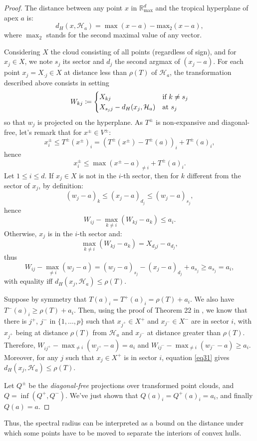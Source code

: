 \documentclass[oneside,UKenglish,a4paper]{amsart}
\numberwithin{equation}{section}
\numberwithin{figure}{section}
\theoremstyle{plain}
\theoremstyle{definition}
\theoremstyle{plain}
\theoremstyle{remark}
\theoremstyle{plain}
\theoremstyle{definition}
\theoremstyle{definition}
\begin{document}
\begin{proof}
The distance between any point $x$ in $\mathbb{R}_{\max}^d$ and the tropical hyperplane of apex $a$ is:
\[ d_H(x, \mathcal{H}_a) = \max(x-a) - \text{max}_2 (x-a), \]
where $\max_2$ stands for the second maximal value of any vector.

Considering $X$ the cloud consisting of all points (regardless of
sign), and for $x_{j}\in X$, we note $s_{j}$
its sector and $d_{j}$ the second argmax of $(x_{j}-a)$. For each
point $x_{j}=X_{\cdot j}\in X$ at distance less than $\rho(T)$ of
$\mathcal{H}_{a}$, the transformation described above consists in setting 
\[
W_{kj}\coloneqq\begin{cases}
X_{kj} & \text{if \ensuremath{k\ne s_{j}}}\\
X_{s_{j}j}-d_H(x_{j},\mathcal{H}_{a}) & \text{at \ensuremath{s_{j}}}
\end{cases}
\]
so that $w_{j}$ is projected on the hyperplane. As $T^{\pm}$ is
non-expansive and diagonal-free, let's remark that for $x^{\pm}\in V^{\pm}$:
\[
x_{i}^{\pm}\le T^{\pm}(x^{\pm})_{i}=\left(T^{\pm}(x^{\pm})-T^{\pm}(a)\right)_{i}+T^{\pm}(a)_{i},
\]
hence
\begin{equation}
\label{eq31}
x_{i}^{\pm}\le\max(x^{\pm}-a)_{\ne i}+T^{\pm}(a)_{i}. 
\end{equation}
Let $1\le i\le d$. If $x_{j}\in X$ is not in the $i$-th sector, then
for $k$ different from the sector of $x_{j}$, by definition: 
\[
(w_{j}-a)_{k}\le(x_{j}-a)_{d_{j}}\le(w_{j}-a)_{s_{j}},
\]
hence 
\[
W_{ij}-\max_{k\ne i}\left(W_{kj}-a_{k}\right)\le a_{i}.
\]
Otherwise, $x_{j}$ is in the $i$-th sector and: 
\[
\max_{k\ne i}\left(W_{kj}-a_{k}\right)=X_{d_{j}j}-a_{d_{j}},
\]
thus 
\[
W_{ij}-\max_{\ne i}\left(w_{j}-a\right)=\left(w_{j}-a\right)_{s_{j}}-\left(x_{j}-a\right)_{d_{j}}+a_{s_{j}}\ge a_{s_{j}}=a_{i},
\]
with equality iff $d_H(x_{j},\mathcal{H}_{a})\leq\rho(T)$.

Suppose by symmetry that $T(a)_{i}=T^{+}(a)_{i}=\rho(T)+a_{i}.$ We
also have $T^{-}(a)_{i}\ge\rho(T)+a_{i}$. Then, using the proof of
Theorem 22 in \cite{Akian2021TropicalLR}, we know that there is
$j^{+}$, $j^{-}$ in $\{1,\ldots, p\}$ such that $x_{j^{+}}\in X^{+}$ and $x_{j^{-}}\in X^{-}$
are in sector $i$, with $x_{j^{+}}$ being at distance $\rho(T)$
from $\mathcal{H}_{a}$ and $x_{j^{-}}$ at distance greater than $\rho(T)$.
Therefore, $W_{ij^{+}}-\max_{\ne i}\left(w_{j^{+}}-a\right)=a_{i}$
and $W_{ij^{-}}-\max_{\ne i}\left(w_{j^{-}}-a\right)\geq a_{i}$.
Moreover, for any $j$ such that $x_{j}\in X^{+}$ is in sector $i$,
equation \ref{eq31} gives $d_H(x_{j},\mathcal{H}_{a})\leq\rho(T)$.

Let $Q^{\pm}$ be the \emph{diagonal-free} projections over transformed
point clouds, and $Q=\inf(Q^{+}, Q^{-}).$ We've just shown that $Q(a)_{i}=Q^{+}(a)_{i}=a_{i}$,
and finally $Q(a)=a$.
\end{proof}
%
Thus, the spectral radius can be interpreted as a bound on the distance
under which some points have to be moved to separate the interiors of convex hulls.
\end{document}
